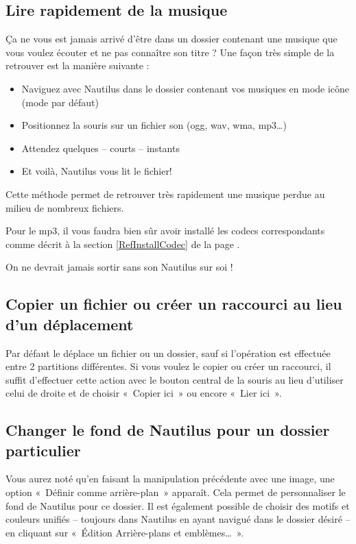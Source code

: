 \subsection{Lire rapidement de la musique}
Ça ne vous est jamais arrivé d'être dans un dossier contenant une musique que vous voulez écouter et ne pas connaître son titre ? Une façon très simple de la retrouver est la manière suivante :\par
\begin{itemize}
\item Naviguez avec Nautilus dans le dossier contenant vos musiques en mode icône (mode par défaut)
\item Positionnez la souris sur un fichier son (ogg, wav, wma, mp3\ldots{})
\item Attendez quelques -- courts -- instants
\item Et voilà, Nautilus vous lit le fichier!
\end{itemize}
Cette méthode permet de retrouver très rapidement une musique perdue au milieu de nombreux fichiers.
\begin{nota}
Pour le mp3, il vous faudra bien sûr avoir installé les codecs correspondants comme décrit à la section \ref{RefInstallCodec} de la page \pageref{RefInstallCodec}.
\end{nota}
On ne devrait jamais sortir sans son Nautilus sur soi !
\subsection{Copier un fichier ou créer un raccourci au lieu d'un déplacement}
Par défaut le  déplace un fichier ou un dossier, sauf si l'opération est effectuée entre 2 partitions différentes. Si vous voulez le copier ou créer un raccourci, il suffit d'effectuer cette action avec le bouton central de la souris au lieu d'utiliser celui de droite et de choisir «~Copier ici~» ou encore «~Lier ici~».
\subsection{Changer le fond de Nautilus pour un dossier particulier}
\label{RefNautilusEmblemeFondDossier}
Vous aurez noté qu'en faisant la manipulation précédente avec une image, une option «~Définir comme arrière-plan~» apparaît. Cela permet de personnaliser le fond de Nautilus pour ce dossier. Il est également possible de choisir des motifs et couleurs unifiés -- toujours dans Nautilus en ayant navigué dans le dossier désiré -- en cliquant sur «~Édition \FlecheDroite Arrière-plans et emblèmes\ldots{}~».
